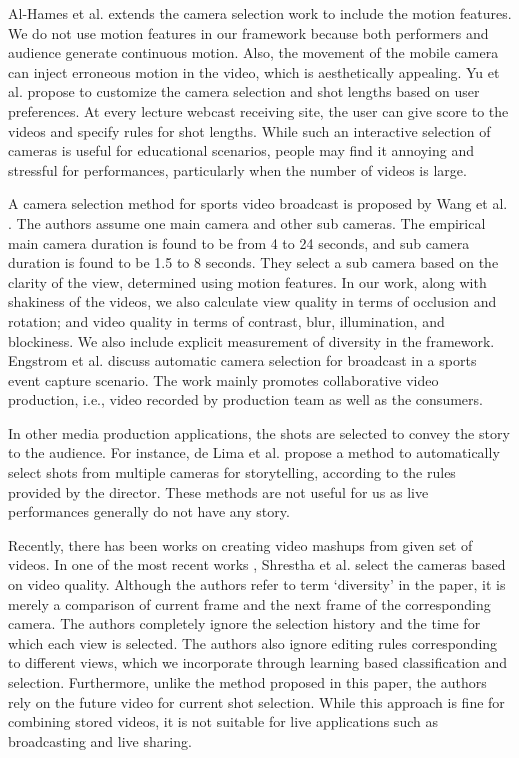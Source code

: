 \documentclass{sig-alternate}
\begin{document}
Al-Hames et al. \cite{3} extends the camera selection work to include
the motion features. We do not use motion features in our framework
because both performers and audience generate continuous
motion. Also, the movement of the mobile camera can inject erroneous
motion in the video, which is aesthetically appealing. Yu et
al. \cite{20} propose to customize the camera selection and shot lengths
based on user preferences. At every lecture webcast receiving site,
the user can give score to the videos and specify rules for shot
lengths. While such an interactive selection of cameras is useful
for educational scenarios, people may find it annoying and stressful
for performances, particularly when the number of videos is
large.

A camera selection method for sports video broadcast is proposed
by Wang et al. \cite{16}. The authors assume one main camera
and other sub cameras. The empirical main camera duration is
found to be from 4 to 24 seconds, and sub camera duration is found
to be 1.5 to 8 seconds. They select a sub camera based on the clarity
of the view, determined using motion features. In our work,
along with shakiness of the videos, we also calculate view quality
in terms of occlusion and rotation; and video quality in terms
of contrast, blur, illumination, and blockiness. We also include
explicit measurement of diversity in the framework. Engstrom et
al. \cite{8} discuss automatic camera selection for broadcast in a sports
event capture scenario. The work mainly promotes collaborative
video production, i.e., video recorded by production team as well
as the consumers.

In other media production applications, the shots are selected to
convey the story to the audience. For instance, de Lima et al. \cite{7} propose a method to automatically select shots from multiple cameras
for storytelling, according to the rules provided by the director.
These methods are not useful for us as live performances generally
do not have any story.

Recently, there has been works on creating video mashups from
given set of videos. In one of the most recent works \cite{15}, Shrestha
et al. select the cameras based on video quality. Although the authors
refer to term \textquoteleft diversity{\textquoteright} in the paper, it is merely a comparison
of current frame and the next frame of the corresponding camera.
The authors completely ignore the selection history and the
time for which each view is selected. The authors also ignore editing
rules corresponding to different views, which we incorporate
through learning based classification and selection. Furthermore,
unlike the method proposed in this paper, the authors rely on the
future video for current shot selection. While this approach is fine
for combining stored videos, it is not suitable for live applications
such as broadcasting and live sharing.
\end{document}
